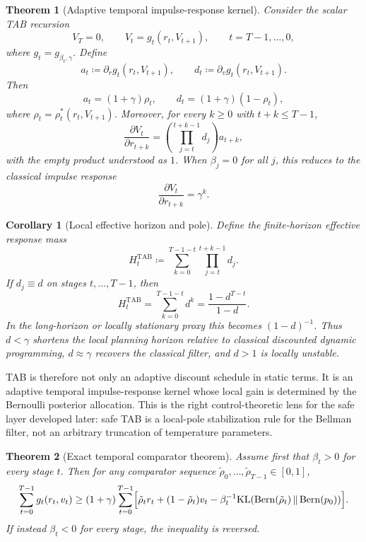 \documentclass{article}
\newtheorem{theorem}{Theorem}[section]
\newtheorem{corollary}[corollary]{Corollary}
\theoremstyle{remark}
\DeclareMathOperator{\Bern}{Bern}
\newcommand{\KL}{\mathrm{KL}}
\newcommand{\defeq}{\coloneqq}
\newcommand{\pprior}{p_0}
\newcommand{\KLbin}[2]{\KL\!\left(\Bern(#1)\,\middle\|\,\Bern(#2)\right)}
\begin{document}
\begin{theorem}[Adaptive temporal impulse-response kernel]
\label{thm:adaptive-impulse-response}
Consider the scalar TAB recursion
\[
V_T=0,
\qquad
V_t=g_t(r_t,V_{t+1}),
\qquad t=T-1,\dots,0,
\]
where $g_t=g_{\beta_t,\gamma}$. Define
\[
a_t \defeq \partial_r g_t(r_t,V_{t+1}),
\qquad
d_t \defeq \partial_v g_t(r_t,V_{t+1}).
\]
Then
\[
a_t=(1+\gamma)\rho_t,
\qquad
d_t=(1+\gamma)(1-\rho_t),
\]
where $\rho_t=\rho_t^*(r_t,V_{t+1})$. Moreover, for every $k\ge 0$ with $t+k\le T-1$,
\[
\frac{\partial V_t}{\partial r_{t+k}}
=
\left(\prod_{j=t}^{t+k-1} d_j\right)a_{t+k},
\]
with the empty product understood as $1$. When $\beta_j=0$ for all $j$, this reduces to the classical impulse response
\[
\frac{\partial V_t}{\partial r_{t+k}}=\gamma^k.
\]
\end{theorem}

\begin{corollary}[Local effective horizon and pole]
\label{cor:effective-horizon}
Define the finite-horizon effective response mass
\[
H_t^{\mathrm{TAB}}
\defeq
\sum_{k=0}^{T-1-t}\prod_{j=t}^{t+k-1}d_j.
\]
If $d_j\equiv d$ on stages $t,\dots,T-1$, then
\[
H_t^{\mathrm{TAB}}=\sum_{k=0}^{T-1-t}d^k=\frac{1-d^{T-t}}{1-d}.
\]
In the long-horizon or locally stationary proxy this becomes $(1-d)^{-1}$. Thus $d<\gamma$ shortens the local planning horizon relative to classical discounted dynamic programming, $d\approx \gamma$ recovers the classical filter, and $d>1$ is locally unstable.
\end{corollary}

TAB is therefore not only an adaptive discount schedule in static terms. It is an adaptive temporal impulse-response kernel whose local gain is determined by the Bernoulli posterior allocation. This is the right control-theoretic lens for the safe layer developed later: safe TAB is a local-pole stabilization rule for the Bellman filter, not an arbitrary truncation of temperature parameters.

\begin{theorem}[Exact temporal comparator theorem]
\label{thm:temporal-comparator}
Assume first that $\beta_t>0$ for every stage $t$.
Then for any comparator sequence $\tilde\rho_0,\dots,\tilde\rho_{T-1}\in[0,1]$,
\begin{equation}
\sum_{t=0}^{T-1} g_t(r_t,v_t)
\ge
(1+\gamma)
\sum_{t=0}^{T-1}
\Bigl[
\tilde\rho_t r_t + (1-\tilde\rho_t)v_t - \beta_t^{-1}\KLbin{\tilde\rho_t}{\pprior}
\Bigr].
\label{eq:temporal-comparator-pos}
\end{equation}
If instead $\beta_t<0$ for every stage, the inequality is reversed.
\end{theorem}
\end{document}
